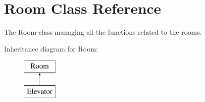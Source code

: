 \hypertarget{classRoom}{}\section{Room Class Reference}
\label{classRoom}


The Room-\/class managing all the functions related to the rooms.  


Inheritance diagram for Room\+:\begin{figure}[H]
\begin{center}
\leavevmode
\includegraphics[height=2.000000cm]{classRoom}
\end{center}
\end{figure}
